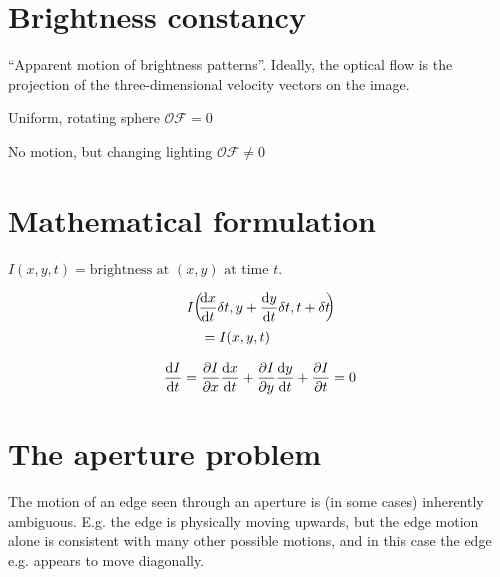 \section{Brightness constancy}
\begin{compactdesc}
	\item[\lp{Definition of Optical Flow}] ``Apparent motion of brightness patterns''. Ideally, the optical flow is the projection of the three-dimensional velocity vectors on the image.
	\item[\lp{Caution required}]
		\begin{enumerate*}[label=\protect\circled{\arabic*}]
			\item Uniform, rotating sphere $\mathcal{OF}=0$
			\item No motion, but changing lighting $\mathcal{OF}\neq0$
		\end{enumerate*}
		\section{Mathematical formulation}
		$I(x,y,t)=\text{brightness at }(x,y)\text{ at time }t$.
	\item[\lp{Brightness constancy assumption:}]
		\begin{align*}
			&I\!\left(\!\! \frac{\mathrm d x}{\mathrm d t}\delta t,y+\frac{\mathrm d y}{\mathrm d t} \delta t,t+\delta t \!\!\right)\!\\
			&\quad=I(x,y,t)
		\end{align*}
	\item[\lp{Optical flow constraint equation:}]
		\begin{gather*}
			\frac{\mathrm d I}{\mathrm d t}=\frac{\partial I}{\partial x}\frac{\mathrm d x}{\mathrm d t}+\frac{\partial I}{\partial y}\frac{\mathrm d y}{\mathrm d t}+\frac{\partial I}{\partial t}=0
		\end{gather*}
		\section{The aperture problem}
		The motion of an edge seen through an aperture is (in some cases) inherently ambiguous. E.g. the edge is physically moving upwards, but the edge motion alone is consistent with many other possible motions, and in this case the edge e.g. appears to move diagonally.

\end{compactdesc}

